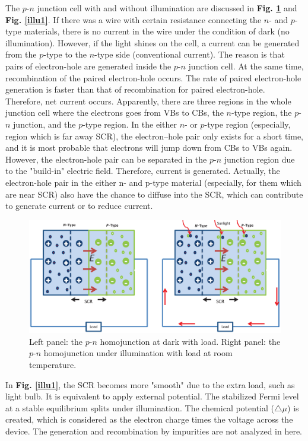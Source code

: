 \documentclass[a4paper, 12pt, titlepage,oneside,drop]{kthesis}
\begin{document}
The $p$-$n$ junction cell with and without illumination are discussed in \textbf{Fig. \ref{illu}} and \textbf{Fig. \ref{illu1}}. If there was a wire with certain resistance connecting 
the $n$- and $p$-type materials, there is no current in the wire under the condition of dark (no illumination). However, if the light shines on the cell, a current can be generated from the $p$-type
to the $n$-type side (conventional current). The reason is that pairs of electron-hole are generated inside the $p$-$n$ junction cell. At the same time, recombination of the paired electron-hole occurs. The rate of paired
electron-hole generation is faster than that of recombination for paired electron-hole. Therefore, net current occurs. Apparently, there are three regions in the whole junction cell where the electrons goes from VBs to CBs, the $n$-type region, the $p$-$n$
junction, and the $p$-type region. In the either $n$- or $p$-type region (especially, region which is far away SCR), the electron–hole pair only exists for a short time,  and it is most probable that electrons
will jump down from CBs to VBs again. However, the electron-hole pair can be separated in the $p$-$n$ junction region due to the "build-in" electric field. Therefore, current is generated. Actually, the electron-hole pair in
the either n- and p-type material (especially, for them which are near SCR) also have the chance to diffuse into the SCR, which can contribute to generate current or to reduce current.

\begin{figure}[H]
\centering
\includegraphics[scale=0.5]{illumination.eps}
\caption{Left panel: the $p$-$n$ homojunction at dark with load. Right panel: the $p$-$n$ homojunction under illumination with load at room temperature.}
\label{illu}
\end{figure}

In \textbf{Fig. \ref{illu1}}, the SCR becomes more "smooth" due to the extra load, such as light bulb. It is equivalent to apply external potential. The stabilized Fermi level at a stable equilibrium splits under illumination.
The chemical potential ($\bigtriangleup \mu$) is created, which is considered as the electron charge times the voltage across the device. The generation and recombination by impurities are not analyzed in here.
\end{document}
